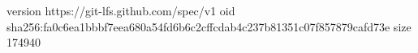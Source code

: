 version https://git-lfs.github.com/spec/v1
oid sha256:fa0c6ea1bbbf7eea680a54fd6b6c2cffcdab4c237b81351c07f857879cafd73e
size 174940
